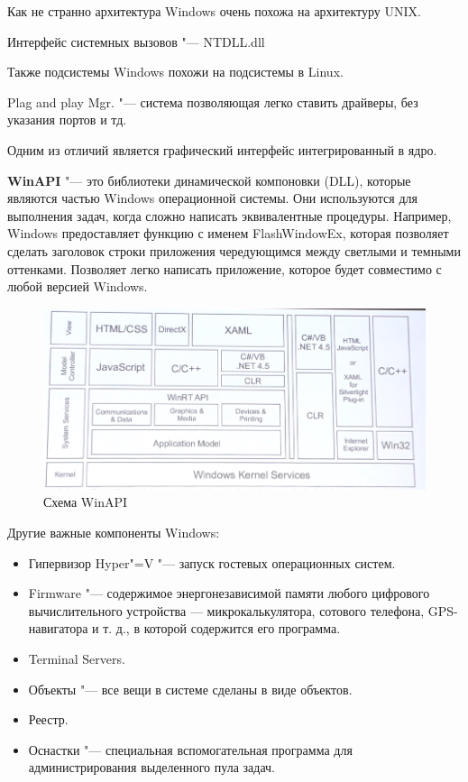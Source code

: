 \documentclass[bachelor, och, book]{SCWorks}
\theoremstyle{remark}
\begin{document}
    Как не странно архитектура Windows очень похожа на архитектуру UNIX.

    Интерфейс системных вызовов "--- NTDLL.dll

    Также подсистемы Windows похожи на подсистемы в Linux.

    Plag and play Mgr. "--- система позволяющая легко ставить драйверы, без указания портов и тд.
    
    Одним из отличий является графический интерфейс интегрированный в ядро.

    \textbf{WinAPI} "--- это библиотеки динамической компоновки (DLL), которые являются частью Windows операционной системы. Они используются для выполнения задач, когда сложно написать эквивалентные процедуры. Например, Windows предоставляет функцию с именем FlashWindowEx, которая позволяет сделать заголовок строки приложения чередующимся между светлыми и темными оттенками. Позволяет легко написать приложение, которое будет совместимо с любой версией Windows.

    \begin{figure}[H]
        \begin{center}
            \includegraphics[scale=0.5]{res/WinAPI.png}
            \caption{Схема WinAPI}
        \end{center}
    \end{figure}

    Другие важные компоненты Windows:
    \begin{itemize}[label=$\bullet$]
        \item Гипервизор Hyper"=V "--- запуск гостевых операционных систем.
        \item Firmware "--- содержимое энергонезависимой памяти любого цифрового вычислительного устройства — микрокалькулятора, сотового телефона, GPS-навигатора и т. д., в которой содержится его программа.
        \item  Terminal Servers.
        \item Объекты "--- все вещи в системе сделаны в виде объектов.
        \item Реестр.
        \item Оснастки "--- специальная вспомогательная программа для администрирования выделенного пула задач.
    \end{itemize}
\end{document}
